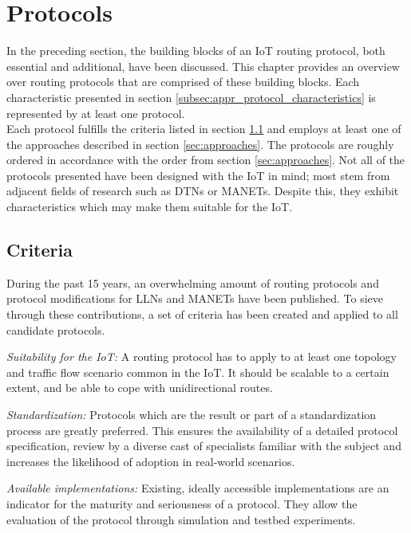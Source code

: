 \section{Protocols}
\label{sec:protocols}
In the preceding section, the building blocks of an \gls{IoT} routing protocol, both essential and additional, have been discussed.
This chapter provides an overview over routing protocols that are comprised of these building blocks. Each characteristic presented in section \ref{subsec:appr_protocol_characteristics} is represented by at least one protocol.\\
Each protocol fulfills the criteria listed in section \ref{subsec:criteria} and employs at least one of the approaches described in section \ref{sec:approaches}. The protocols are roughly ordered in accordance with the order from section \ref{sec:approaches}.
Not all of the protocols presented have been designed with the IoT in mind; most stem from adjacent fields of research such as \glspl{DTN} or \glspl{MANET}. %
Despite this, they exhibit characteristics which may make them suitable for the \gls{IoT}.

\subsection{Criteria}
\label{subsec:criteria}
During the past 15 years, an overwhelming amount of routing protocols and protocol modifications for \glspl{LLN} and \glspl{MANET} have been published. To sieve through these contributions, a set of criteria has been created and applied to all candidate protocols.
\begin{description}
\item{\emph{Suitability for the IoT:}} A routing protocol has to apply to at least one topology and traffic flow scenario common in the \gls{IoT}. It should be scalable to a certain extent, and be able to cope with unidirectional routes.
\item{\emph{Standardization:}} Protocols which are the result or part of a standardization process are greatly preferred. This ensures the availability of a detailed protocol specification, review by a diverse cast of specialists familiar with the subject and increases the likelihood of adoption in real-world scenarios.
\item{\emph{Available implementations:}} Existing, ideally accessible implementations are an indicator for the maturity and seriousness of a protocol. They allow the evaluation of the protocol through simulation and testbed experiments.

\end{description}

